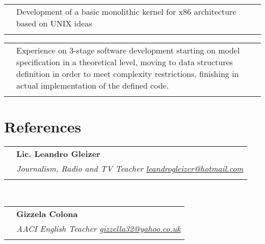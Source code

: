 \documentclass[a4paper,10pt]{article}
\newcommand{\workEntry}[5]{
\begin{tabular}{p{1.7cm}|p{11cm}}
\raggedleft \textsc{#1} & #3 \\
\raggedleft \textsc{#2} & \emph{#4} \\
& \footnotesize{#5}\\
\multicolumn{2}{c}{}\ %
\end{tabular}
}
\newcommand{\dateEntry}[4]{
\begin{tabular}{p{1.7cm}|p{11cm}}
\raggedleft \textsc{#1} & #3 \\
\raggedleft \textsc{#2} & \footnotesize{#4}\\
\multicolumn{2}{c}{}\ %
\end{tabular}
}
\newcommand{\resEntry}[1]{
\begin{tabular}{p{1.7cm}|p{11cm}}
& #1 \\
\multicolumn{2}{c}{}\
\end{tabular}
}
\newcommand{\resEntryD}[2]{
\begin{tabular}{p{1.7cm}|p{11cm}}
& #1 \\
& \emph{#2} \\
\multicolumn{2}{c}{}\
\end{tabular}
}
\begin{document}
\resEntry{Development of a basic monolithic kernel for x86 architecture based on UNIX ideas}{}

\resEntry{Experience on 3-stage software development starting on model specification in a theoretical level, %
moving to data structures definition in order to meet complexity restrictions, finishing in actual implementation %
of the defined code.}

%




\section{References}
\resEntryD{\textbf{Lic. Leandro Gleizer}}%
{Journalism, Radio and TV Teacher \newline
\href{mailto:leandrogleizer@hotmail.com}{leandrogleizer@hotmail.com}}\\

\resEntryD{\textbf{Gizzela Colona}}%
{AACI English Teacher \newline
\href{mailto:gizzella32@yahoo.co.uk}{gizzella32@yahoo.co.uk}}\\
\end{document}
